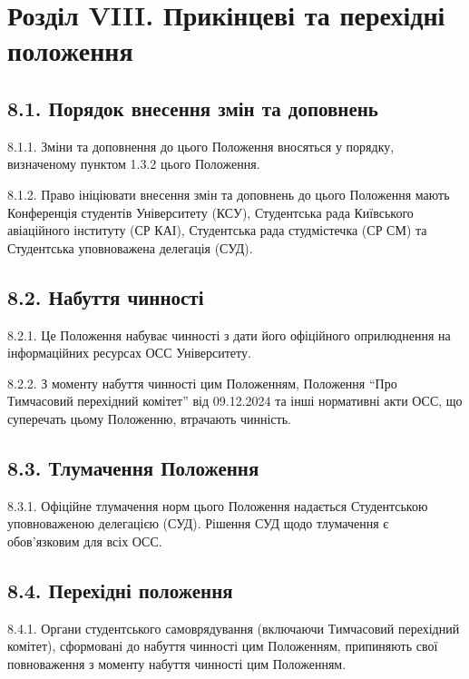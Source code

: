 \section*{Розділ VIII. Прикінцеві та перехідні положення}

\subsection*{8.1. Порядок внесення змін та доповнень}
    8.1.1. Зміни та доповнення до цього Положення вносяться у порядку, визначеному пунктом 1.3.2 цього Положення.

    8.1.2. Право ініціювати внесення змін та доповнень до цього Положення мають Конференція студентів Університету (КСУ), Студентська рада Київського авіаційного інституту (СР КАІ), Студентська рада студмістечка (СР СМ) та Студентська уповноважена делегація (СУД).

\subsection*{8.2. Набуття чинності}
    8.2.1. Це Положення набуває чинності з дати його офіційного оприлюднення на інформаційних ресурсах ОСС Університету.

    8.2.2. З моменту набуття чинності цим Положенням, Положення ``Про Тимчасовий перехідний комітет'' від 09.12.2024 та інші нормативні акти ОСС, що суперечать цьому Положенню, втрачають чинність.

\subsection*{8.3. Тлумачення Положення}
    8.3.1. Офіційне тлумачення норм цього Положення надається Студентською уповноваженою делегацією (СУД). Рішення СУД щодо тлумачення є обов'язковим для всіх ОСС.

\subsection*{8.4. Перехідні положення}
    8.4.1. Органи студентського самоврядування (включаючи Тимчасовий перехідний комітет), сформовані до набуття чинності цим Положенням, припиняють свої повноваження з моменту набуття чинності цим Положенням.

